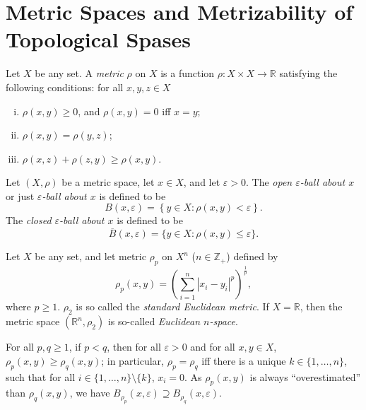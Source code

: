 \section{Metric Spaces and Metrizability of Topological Spases}


\begin{definition}
	\label{def: metric spaces}
	Let $X$ be any set. A \textit{metric} $\rho$ on $X$ is a function $\rho: X \times X \to \mathbb R$ satisfying the following conditions: for all $x,y,z \in X$
	\begin{enumerate}[(i)]
		\item $\rho(x,y) \ge 0$, and $\rho(x,y) = 0$ iff $x = y$;
		\item $\rho(x,y) = \rho(y,z)$;
		\item $\rho(x,z) + \rho(z,y) \ge \rho(x,y)$.
	\end{enumerate}
\end{definition}


\begin{definition}
	[balls]
	\label{def: balls}
	Let $(X, \rho)$ be a metric space, let $x \in X$, and let $\varepsilon > 0$. The \textit{open $\varepsilon$-ball about $x$} or just \textit{$\varepsilon$-ball about $x$} is defined to be
	$$
	B(x, \varepsilon) = \left\{ y \in X : \rho(x,y) < \varepsilon \right\}.
	$$
	The \textit{closed $\varepsilon$-ball about $x$} is defined to be
	$$
	\overline B (x, \varepsilon) = \{ y \in X : \rho(x,y) \le \varepsilon \}.
	$$
\end{definition}


\begin{example}
	\label{eg: Euclidean metrics}
	Let $X$ be any set, and let metric $\rho_p$ on $X^n$ ($n \in \mathbb Z_+$) defined by
	$$
	\rho_p (x,y) = \left( \sum_{i = 1}^n |x_i - y_i|^p \right)^\frac{1}{p},
	$$
	where $p \ge 1$. $\rho_2$ is so called the \textit{standard Euclidean metric}. If $X = \mathbb R$, then the metric space $(\mathbb R^n, \rho_2)$ is so-called \textit{Euclidean $n$-space}.
	
	For all $p,q \ge 1$, if $p < q$, then for all $\varepsilon > 0$ and for all $x,y \in X$, $\rho_p(x,y) \ge \rho_q(x,y)$; in particular, $\rho_p = \rho_q$ iff there is a unique $k \in \{1, \ldots, n\}$, such that for all $i \in \{1, \ldots, n\} \setminus \{k\}$, $x_i = 0$. As $\rho_p(x,y)$ is always ``overestimated'' than $\rho_q(x,y)$, we have $B_{\rho_p}(x, \varepsilon) \supseteq B_{\rho_q}(x,\varepsilon)$.
\end{example}


